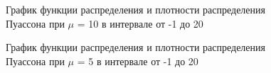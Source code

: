 \documentclass[14pt, a4paper]{extarticle}
\begin{document}
	\newpage
	
	\begin{figure}[h]
		\centering\caption{График функции распределения и плотности распределения Пуассона при $\mu$ = 10 в интервале от -1 до 20}
	\end{figure}
	
	\newpage
	
	\begin{figure}[h]
		\centering\caption{График функции распределения и плотности распределения Пуассона при $\mu$ = 5 в интервале от -1 до 20}
	\end{figure}
\end{document}
